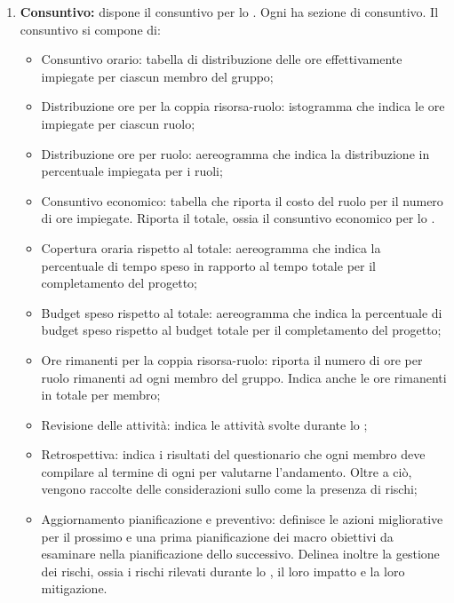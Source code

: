 \begin{enumerate}
\begin{itemize}
  \end{itemize}
  \item \textbf{Consuntivo:} dispone il consuntivo per lo . Ogni  ha sezione di consuntivo. Il consuntivo si compone di:
  \begin{itemize}
    \item Consuntivo orario: tabella di distribuzione delle ore effettivamente impiegate per ciascun membro del gruppo;
    \item Distribuzione ore per la coppia risorsa-ruolo: istogramma che indica le ore impiegate per ciascun ruolo;
    \item Distribuzione ore per ruolo: aereogramma che indica la distribuzione in percentuale impiegata per i ruoli;
    \item Consuntivo economico: tabella che riporta il costo del ruolo per il numero di ore impiegate. Riporta il totale, ossia il consuntivo economico per lo .
    \item Copertura oraria rispetto al totale: aereogramma che indica la percentuale di tempo speso in rapporto al tempo totale per il completamento del progetto;
    \item Budget speso rispetto al totale: aereogramma che indica la percentuale di budget speso rispetto al budget totale per il completamento del progetto;
    \item Ore rimanenti per la coppia risorsa-ruolo: riporta il numero di ore per ruolo rimanenti ad ogni membro del gruppo. Indica anche le ore rimanenti in totale per membro;
    \item Revisione delle attività: indica le attività svolte durante lo ;
    \item Retrospettiva: indica i risultati del questionario che ogni membro deve compilare al termine di ogni  per valutarne l'andamento. Oltre a ciò, vengono raccolte delle considerazioni sullo  come la presenza di rischi;
    \item Aggiornamento pianificazione e preventivo: definisce le azioni migliorative per il prossimo  e una prima pianificazione dei macro obiettivi da esaminare nella pianificazione dello  successivo. Delinea inoltre la gestione dei rischi, ossia i rischi rilevati durante lo , il loro impatto e la loro mitigazione.
  \end{itemize}
\end{enumerate} 

